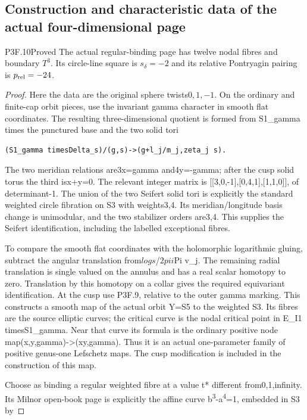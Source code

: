 \subsection{Construction and characteristic data of the actual four-dimensional page}
\begin{statement}{P3F.10}{Proved}
The actual regular-binding page has twelve nodal fibres and boundary $T^3$. Its circle-line square is $s_\delta=-2$ and its relative Pontryagin pairing is $p_{\rm rel}=-24$.
\end{statement}
\begin{proof}
Here the data are the original sphere twists\(0,1,-1\). On the ordinary and finite-cap orbit pieces, use the invariant gamma character in smooth flat coordinates. The resulting three-dimensional quotient is formed from S1\_gamma times the punctured base and the two solid tori

\begin{lstlisting}
(S1_gamma timesDelta_s)/(g,s)->(g+l_j/m_j,zeta_j s).
\end{lstlisting}

The two meridian relations are3x=gamma and4y=-gamma; after the cusp solid torus the third isx+y=0. The relevant integer matrix is {[}{[}3,0,-1{]},{[}0,4,1{]},{[}1,1,0{]}{]}, of determinant-1. The union of the two Seifert solid tori is explicitly the standard weighted circle fibration on S3 with weights3,4. Its meridian/longitude basis change is unimodular, and the two stabilizer orders are3,4. This supplies the Seifert identification, including the labelled exceptional fibres.

To compare the smooth flat coordinates with the holomorphic logarithmic gluing, subtract the angular translation from\(log s\)/\(2pi i\)Pi v\_j. The remaining radial translation is single valued on the annulus and has a real scalar homotopy to zero. Translation by this homotopy on a collar gives the required equivariant identification. At the cusp use P3F.9, relative to the outer gamma marking. This constructs a smooth map of the actual orbit Y=S5 to the weighted S3. Its fibres are the source elliptic curves; the critical curve is the nodal critical point in E\_I1 timesS1\_gamma. Near that curve its formula is the ordinary positive node map(x,y,gamma)-\textgreater(xy,gamma). Thus it is an actual one-parameter family of positive genus-one Lefschetz maps. The cusp modification is included in the construction of this map.

Choose as binding a regular weighted fibre at a value t* different from0,1,infinity. Its Milnor open-book page is explicitly the affine curve b\textsuperscript{3}-a\textsuperscript{4}=1, embedded in S3 by


\end{proof}
